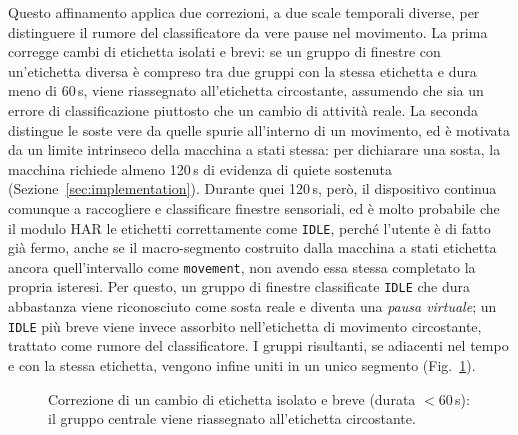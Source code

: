 \documentclass[conference]{IEEEtran}
\begin{document}
Questo affinamento applica due correzioni, a due scale temporali
diverse, per distinguere il rumore del classificatore da vere pause
nel movimento. La prima corregge cambi di etichetta isolati e brevi:
se un gruppo di finestre con un'etichetta diversa è compreso tra due
gruppi con la stessa etichetta e dura meno di 60\,s, viene riassegnato
all'etichetta circostante, assumendo che sia un errore di
classificazione piuttosto che un cambio di attività reale. La seconda
distingue le soste vere da quelle spurie all'interno di un movimento,
ed è motivata da un limite intrinseco della macchina a stati stessa:
per dichiarare una sosta, la macchina richiede almeno 120\,s di
evidenza di quiete sostenuta (Sezione~\ref{sec:implementation}).
Durante quei 120\,s, però, il dispositivo continua comunque a
raccogliere e classificare finestre sensoriali, ed è molto probabile
che il modulo HAR le etichetti correttamente come \texttt{IDLE},
perché l'utente è di fatto già fermo, anche se il macro-segmento
costruito dalla macchina a stati etichetta ancora quell'intervallo
come \texttt{movement}, non avendo essa stessa completato la propria
isteresi. Per questo, un gruppo di finestre classificate
\texttt{IDLE} che dura abbastanza viene riconosciuto
come sosta reale e
diventa una \emph{pausa virtuale}; un \texttt{IDLE} più breve viene
invece assorbito nell'etichetta di movimento circostante, trattato
come rumore del classificatore. I gruppi risultanti, se adiacenti nel
tempo e con la stessa etichetta, vengono infine uniti in un unico
segmento (Fig.~\ref{fig:isolated-label}).

\begin{figure}[htbp]
\centering
{}
\caption{Correzione di un cambio di etichetta isolato e breve (durata
$<60$\,s): il gruppo centrale viene riassegnato all'etichetta
circostante.}
\label{fig:isolated-label}
\end{figure}
\end{document}
